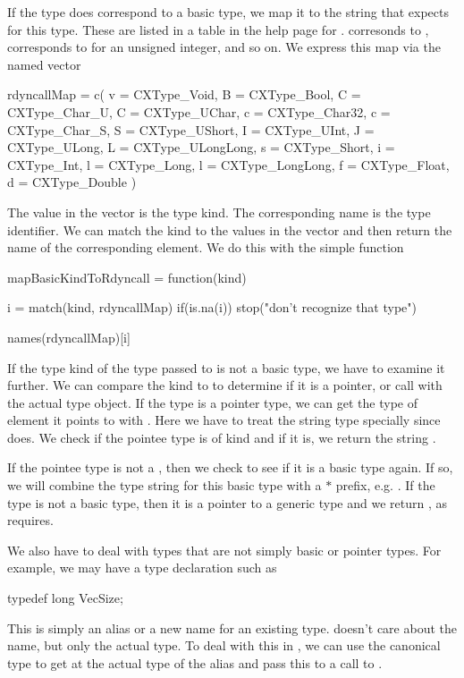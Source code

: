 If the type does correspond to a basic type, we map it to 
the string that  expects for this type.
These are listed in a table in the help page for .
 corresonds to ,  corresponds
to  for an unsigned integer, and so on.
We express this map via the named \R{} vector
\begin{RCode}
rdyncallMap = c(
  v = CXType_Void,
  B = CXType_Bool,
  C = CXType_Char_U,
  C = CXType_UChar,
  c = CXType_Char32,
  c = CXType_Char_S,
  S = CXType_UShort,
  I = CXType_UInt,
  J = CXType_ULong,
  L = CXType_ULongLong,
  s = CXType_Short,
  i = CXType_Int,
  l = CXType_Long,
  l = CXType_LongLong,
  f = CXType_Float,
  d = CXType_Double
)
\end{RCode}
The value in the vector is the \libclang{} type kind. The
corresponding name is the  type identifier.
We can match the \libclang{} kind to the values in the vector and then
return the name of the corresponding element.
We do this with the simple function
\begin{RCode}
mapBasicKindToRdyncall =
function(kind)
{
  i = match(kind, rdyncallMap)
  if(is.na(i))
    stop("don't recognize that type")

  names(rdyncallMap)[i]
}
\end{RCode}
  
If the type kind of the type passed to  is not a basic
type, we have to examine it further.  We can compare the kind to
 to determine if it is a pointer, or call
 with the actual type object.  If the type is a
pointer type, we can get the type of element it points to with
.  Here we have to treat the \C{} string type
 specially since  does.  We check if the
pointee type is of kind  and if it is, we return
the  string .

If the pointee type is not a , then we check to
see if it is a basic type again. If so, we will combine the type
string for this basic type with a $\ast$ prefix, e.g. .  If
the type is not a basic type, then it is a pointer to a generic \C{}
type and we return , as  requires.

We also have to deal with types that are not simply basic or pointer
types. For example, we may have a type declaration such as
\begin{CCode}
typedef long VecSize;
\end{CCode}
This is simply an alias or a new name for an existing type.
 doesn't care about the name, but only the actual type.
To deal with this in , we can
use the canonical type to get at the actual type of the alias 
and pass this to a call to .

